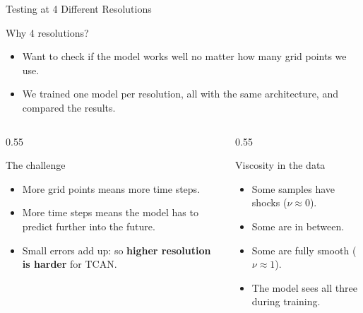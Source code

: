 \begin{frame}{\Large Testing at 4 Different Resolutions}
\vspace{-0.6em}
  \begin{block}{Why 4 resolutions?}
    \begin{itemize}
      \item Want to check if the model works well no matter how many
    grid points we use.
    \item We trained one model per resolution, all with the same architecture, and compared the results.
    \end{itemize}
  \end{block}
\vspace{-1.7em}
  \begin{columns}[t]
    \begin{column}{0.55\textwidth}
      \begin{block}{\centering The challenge}
        \begin{itemize}\setlength\itemsep{4pt}
          \item More grid points means more time steps.
          \item More time steps means the model has to
            predict further into the future.
          \item Small errors add up: so \textbf{higher resolution is harder} for TCAN.
        \end{itemize}
      \end{block}
    \end{column}
    \begin{column}{0.55\textwidth}
      \begin{block}{\centering Viscosity in the data}
        \begin{itemize}\setlength\itemsep{4pt}
          \item Some samples have shocks ($\nu \approx 0$).
          \item Some are in between.
          \item Some are fully smooth ($\nu \approx 1$).
          \item The model sees all three during training.
        \end{itemize}
      \end{block}
    \end{column}
  \end{columns}

\end{frame}